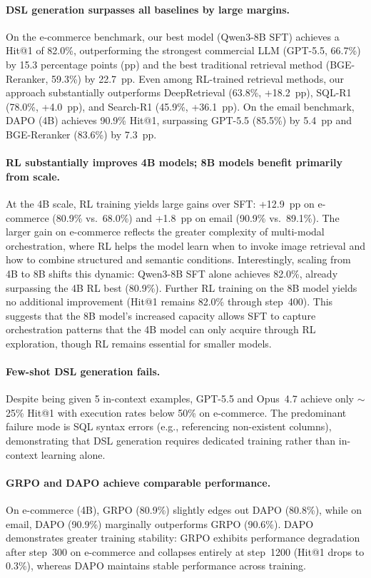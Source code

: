 \paragraph{DSL generation surpasses all baselines by large margins.}
On the e-commerce benchmark, our best model (Qwen3-8B SFT) achieves a Hit@1 of 82.0\%, outperforming the strongest commercial LLM (GPT-5.5, 66.7\%) by 15.3 percentage points (pp) and the best traditional retrieval method (BGE-Reranker, 59.3\%) by 22.7~pp. Even among RL-trained retrieval methods, our approach substantially outperforms DeepRetrieval (63.8\%, +18.2~pp), SQL-R1 (78.0\%, +4.0~pp), and Search-R1 (45.9\%, +36.1~pp). On the email benchmark, DAPO (4B) achieves 90.9\% Hit@1, surpassing GPT-5.5 (85.5\%) by 5.4~pp and BGE-Reranker (83.6\%) by 7.3~pp.

\paragraph{RL substantially improves 4B models; 8B models benefit primarily from scale.}
At the 4B scale, RL training yields large gains over SFT: +12.9~pp on e-commerce (80.9\% vs.\ 68.0\%) and +1.8~pp on email (90.9\% vs.\ 89.1\%). The larger gain on e-commerce reflects the greater complexity of multi-modal orchestration, where RL helps the model learn when to invoke image retrieval and how to combine structured and semantic conditions.
Interestingly, scaling from 4B to 8B shifts this dynamic: Qwen3-8B SFT alone achieves 82.0\%, already surpassing the 4B RL best (80.9\%). Further RL training on the 8B model yields no additional improvement (Hit@1 remains 82.0\% through step~400). This suggests that the 8B model's increased capacity allows SFT to capture orchestration patterns that the 4B model can only acquire through RL exploration, though RL remains essential for smaller models.

\paragraph{Few-shot DSL generation fails.}
Despite being given 5 in-context examples, GPT-5.5 and Opus~4.7 achieve only $\sim$25\% Hit@1 with execution rates below 50\% on e-commerce. The predominant failure mode is SQL syntax errors (e.g., referencing non-existent columns), demonstrating that DSL generation requires dedicated training rather than in-context learning alone.

\paragraph{GRPO and DAPO achieve comparable performance.}
On e-commerce (4B), GRPO (80.9\%) slightly edges out DAPO (80.8\%), while on email, DAPO (90.9\%) marginally outperforms GRPO (90.6\%). DAPO demonstrates greater training stability: GRPO exhibits performance degradation after step~300 on e-commerce and collapses entirely at step~1200 (Hit@1 drops to 0.3\%), whereas DAPO maintains stable performance across training.


